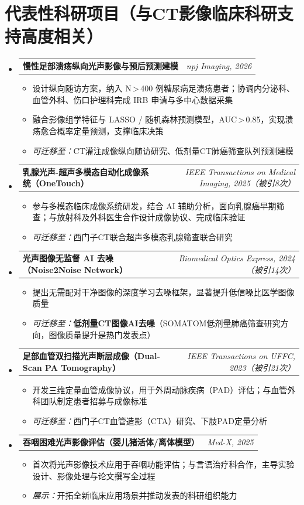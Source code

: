 \documentclass[letterpaper,10pt]{article}
\makeatletter
\newcommand{\projheading}[2]{
  \vspace{1pt}\item
  \begin{tabular*}{0.97\textwidth}[t]{l@{\extracolsep{\fill}}r}
    \textbf{#1} & \textit{\small#2} \\
  \end{tabular*}\vspace{2pt}
}
\newcommand{\projItemListStart}{\begin{itemize}[leftmargin=0.2in, topsep=3pt]}
\newcommand{\projItemListEnd}{\end{itemize}\vspace{2pt}}
\makeatother
\begin{document}
\vspace{-2pt}

\section{代表性科研项目（与CT影像临床科研支持高度相关）}

\begin{itemize}[leftmargin=0in, label={}]

  \projheading{慢性足部溃疡纵向光声影像与预后预测建模}{npj Imaging, 2026}
  \projItemListStart
    \item 设计纵向随访方案，纳入 N\,>\,400 例糖尿病足溃疡患者；协调内分泌科、血管外科、伤口护理科完成 IRB 申请与多中心数据采集
    \item 融合影像组学特征与 LASSO / 随机森林预测模型，AUC\,>\,0.85，实现溃疡愈合概率定量预测，支撑临床决策
    \item \textit{可迁移至：}CT灌注成像纵向随访研究、低剂量CT肺癌筛查队列预测建模
  \projItemListEnd

  \projheading{乳腺光声-超声多模态自动化成像系统（OneTouch）}{IEEE Transactions on Medical Imaging, 2025（被引8次）}
  \projItemListStart
    \item 参与多模态临床成像系统研发，结合 AI 辅助分析，面向乳腺癌早期筛查；与放射科及外科医生合作设计成像协议、完成临床验证
    \item \textit{可迁移至：}西门子CT联合超声多模态乳腺筛查联合研究
  \projItemListEnd

  \projheading{光声图像无监督 AI 去噪（Noise2Noise Network）}{Biomedical Optics Express, 2024（被引14次）}
  \projItemListStart
    \item 提出无需配对干净图像的深度学习去噪框架，显著提升低信噪比医学图像质量
    \item \textit{可迁移至：}\textbf{低剂量CT图像AI去噪}（SOMATOM低剂量肺癌筛查研究方向，图像质量提升是热门发表点）
  \projItemListEnd

  \projheading{足部血管双扫描光声断层成像（Dual-Scan PA Tomography）}{IEEE Transactions on UFFC, 2023（被引21次）}
  \projItemListStart
    \item 开发三维定量血管成像协议，用于外周动脉疾病（PAD）评估；与血管外科团队制定患者招募与成像标准
    \item \textit{可迁移至：}西门子CT血管造影（CTA）研究、下肢PAD定量分析
  \projItemListEnd

  \projheading{吞咽困难光声影像评估（婴儿猪活体/离体模型）}{Med-X, 2025}
  \projItemListStart
    \item 首次将光声影像技术应用于吞咽功能评估；与言语治疗科合作，主导实验设计、影像处理与论文撰写全过程
    \item \textit{展示：}开拓全新临床应用场景并推动发表的科研组织能力
  \projItemListEnd


\end{itemize}
\end{document}
